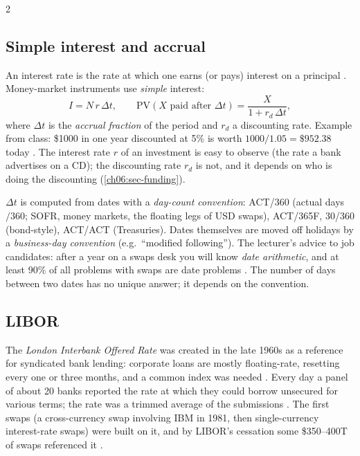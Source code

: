 \begin{paracol}{2}
\subsection{Simple interest and accrual}
An interest rate is the rate at which one earns (or pays) interest on a principal . Money-market
instruments use \emph{simple} interest:
\begin{equation}\label{ch06:eq-simple}
  I = N\,r\,\Delta t,\qquad
  \mathrm{PV}(X \text{ paid after } \Delta t) = \frac{X}{1+r_d\,\Delta t},
\end{equation}
where $\Delta t$ is the \emph{accrual fraction} of the period and $r_d$ a discounting rate. Example from class:
\$1000 in one year discounted at 5\% is worth $1000/1.05=\$952.38$ today . The interest rate
$r$ of an investment is easy to observe (the rate a bank advertises on a CD); the discounting rate $r_d$ is not,
and it depends on who is doing the discounting (\cref{ch06:sec-funding}).

\begin{coursenote}
$\Delta t$ is computed from dates with a \emph{day-count convention}: ACT/360 (actual days$/360$; SOFR, money
markets, the floating legs of USD swaps), ACT/365F, 30/360 (bond-style), ACT/ACT (Treasuries). Dates themselves
are moved off holidays by a \emph{business-day convention} (e.g.\ ``modified following''). The lecturer's advice
to job candidates: after a year on a swaps desk you will know \emph{date arithmetic}, and at least 90\% of all
problems with swaps are date problems . The number of days between two dates has no unique answer;
it depends on the convention.
\end{coursenote}

\subsection{LIBOR}
The \emph{London Interbank Offered Rate} was created in the late 1960s as a reference for syndicated bank
lending: corporate loans are mostly floating-rate, resetting every one or three months, and a common index was
needed . Every day a panel of about 20 banks reported the rate at which they could borrow
unsecured for various terms; the rate was a trimmed average of the submissions . The first
swaps (a cross-currency swap involving IBM in 1981, then single-currency interest-rate swaps) were built on it, and
by LIBOR's cessation some \$350--400T of swaps referenced it .


\end{paracol}
